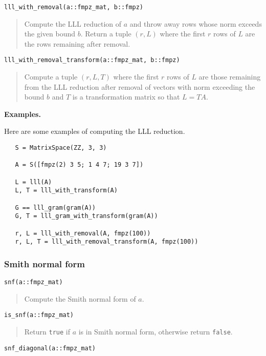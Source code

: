 \documentclass[a4paper,10pt]{article}
\newcommand{\code}{\lstinline}
\newcommand{\desc}[1]{\vspace{-3mm}\begin{quote}#1\end{quote}}
\begin{document}
{{\begin{lstlisting}
lll_with_removal(a::fmpz_mat, b::fmpz)
\end{lstlisting}

\desc{Compute the LLL reduction of $a$ and throw away rows whose norm exceeds
the given bound $b$. Return a tuple $(r, L)$ where the first $r$ rows of $L$
are the rows remaining after removal.}

\begin{lstlisting}
lll_with_removal_transform(a::fmpz_mat, b::fmpz)
\end{lstlisting}

\desc{Compute a tuple $(r, L, T)$ where the first $r$ rows of $L$ are those
remaining from the LLL reduction after removal of vectors with norm exceeding
the bound $b$ and $T$ is a transformation matrix so that $L = TA$.}

\textbf{Examples.}

Here are some examples of computing the LLL reduction.

\begin{lstlisting}
   S = MatrixSpace(ZZ, 3, 3)

   A = S([fmpz(2) 3 5; 1 4 7; 19 3 7])
   
   L = lll(A)
   L, T = lll_with_transform(A)

   G == lll_gram(gram(A))
   G, T = lll_gram_with_transform(gram(A))

   r, L = lll_with_removal(A, fmpz(100))
   r, L, T = lll_with_removal_transform(A, fmpz(100))
\end{lstlisting}

\subsubsection{Smith normal form}

\begin{lstlisting}
snf(a::fmpz_mat)
\end{lstlisting}

\desc{Compute the Smith normal form of $a$.}

\begin{lstlisting}
is_snf(a::fmpz_mat)
\end{lstlisting}

\desc{Return \code{true} if $a$ is in Smith normal form, otherwise return
\code{false}.}

\begin{lstlisting}
snf_diagonal(a::fmpz_mat)
\end{lstlisting}

}}
\end{document}
